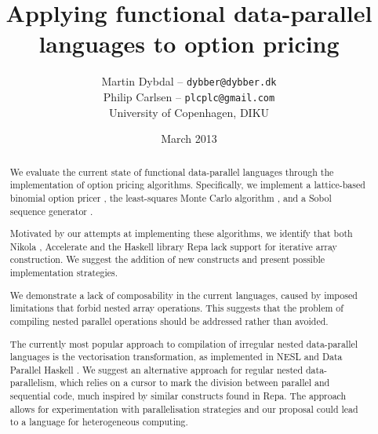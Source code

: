 \documentclass[10pt,a4paper,final,openright,twoside]{memoir}
\title{Applying functional data-parallel languages to option pricing}
\author{
  Martin Dybdal -- \texttt{dybber@dybber.dk} \\
  Philip Carlsen -- \texttt{plcplc@gmail.com}
\\
University of Copenhagen, DIKU}
\date{March 2013}
\begin{document}
\frontmatter






 \clearpage
~
\vspace{3cm}
  \begin{abstract}
    We evaluate the current state of functional data-parallel
    languages through the implementation of option pricing
    algorithms. Specifically, we implement a lattice-based binomial
    option pricer \cite{cox1979option}, the least-squares Monte Carlo
    algorithm \cite{longstaff2001valuing}, and a Sobol sequence
    generator \cite{bratley1988algorithm}.

    Motivated by our attempts at implementing these algorithms, we
    identify that both Nikola \cite{mainland2010nikola}, Accelerate
    \cite{chakravarty2011accelerating} and the Haskell library Repa
    \cite{keller2010regular} lack support for iterative array
    construction. We suggest the addition of new constructs and
    present possible implementation strategies.

    We demonstrate a lack of composability in the current languages,
    caused by imposed limitations that forbid nested array
    operations. This suggests that the problem of compiling nested
    parallel operations should be addressed rather than avoided.

    The currently most popular approach to compilation of irregular
    nested data-parallel languages is the vectorisation
    transformation, as implemented in NESL \cite{nesl} and Data
    Parallel Haskell \cite{spj2008dph}. We suggest an alternative
    approach for regular nested data-parallelism, which relies on a
    cursor to mark the division between parallel and sequential code,
    much inspired by similar constructs found in Repa. The approach
    allows for experimentation with parallelisation strategies and our
    proposal could lead to a language for heterogeneous computing.
  \end{abstract}
\end{document}
